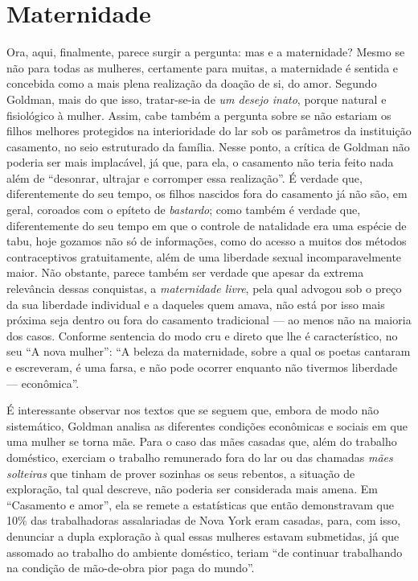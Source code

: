 \section{Maternidade}

Ora, aqui, finalmente, parece surgir a pergunta: mas e a maternidade?
Mesmo se não para todas as mulheres, certamente para muitas, a
maternidade é sentida e concebida como a mais plena realização da doação
de si, do amor. Segundo Goldman, mais do que isso, tratar-se-ia de \textit{um
desejo inato}, porque natural e fisiológico à mulher. Assim, cabe
também a pergunta sobre se não estariam os filhos melhores protegidos na
interioridade do lar sob os parâmetros da instituição casamento, no seio
estruturado da família. Nesse ponto, a crítica de Goldman não poderia
ser mais implacável, já que, para ela, o casamento não teria feito nada
além de ``desonrar, ultrajar e corromper essa realização''. É verdade
que, diferentemente do seu tempo, os filhos nascidos fora do casamento
já não são, em geral, coroados com o epíteto de \textit{bastardo}; como
também é verdade que, diferentemente do seu tempo em que o controle de
natalidade era uma espécie de tabu, hoje gozamos não só de informações,
como do acesso a muitos dos métodos contraceptivos gratuitamente, além
de uma liberdade sexual incomparavelmente maior. Não obstante, parece
também ser verdade que apesar da extrema relevância dessas conquistas, a
\textit{maternidade livre}, pela qual advogou sob o preço da sua liberdade
individual e a daqueles quem amava, não está por isso mais próxima seja
dentro ou fora do casamento tradicional --- ao menos não na maioria dos
casos. Conforme sentencia do modo cru e direto que lhe é característico,
no seu ``A nova mulher'': ``A beleza da maternidade, sobre a qual os
poetas cantaram e escreveram, é uma farsa, e não pode ocorrer enquanto
não tivermos liberdade --- econômica''.

É interessante observar nos textos que se seguem que, embora de modo não
sistemático, Goldman analisa as diferentes condições econômicas e
sociais em que uma mulher se torna mãe. Para o caso das mães casadas
que, além do trabalho doméstico, exerciam o trabalho remunerado fora do
lar ou das chamadas \textit{mães solteiras} que tinham de prover sozinhas os
seus rebentos, a situação de exploração, tal qual descreve, não poderia
ser considerada mais amena. Em ``Casamento e amor'', ela se remete a
estatísticas que então demonstravam que 10\% das trabalhadoras
assalariadas de Nova York eram casadas, para, com isso, denunciar a
dupla exploração à qual essas mulheres estavam submetidas, já que
assomado ao trabalho do ambiente doméstico, teriam ``de continuar
trabalhando na condição de mão-de-obra pior paga do mundo''. 

